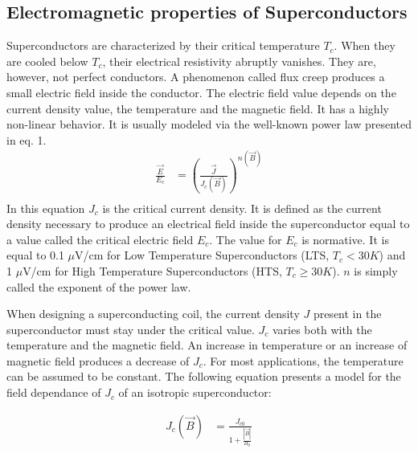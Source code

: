 \documentclass{ws-jmrr}
\begin{document}
\begin{multicols}{2}
\section{Electromagnetic properties of Superconductors}
\label{elec}
Superconductors are characterized by their critical temperature $T_c$. When they are cooled below $T_c$, their electrical resistivity abruptly vanishes. They are, however, not perfect conductors. A phenomenon called flux creep \cite{feigel1989theory} produces a small electric field inside the conductor. The electric field value depends on the current density value, the temperature and the magnetic field. It has a highly non-linear behavior. It is usually modeled via the well-known power law \cite{ONOGI1989991} presented in eq. 1.
\begin{align}
\frac{\vec{E}}{E_c}&=\left (\frac{\vec{J}}{J_c(\vec{B})}  \right )^{n(\vec{B})}
\label{powerlaw}\\
\end{align}
In this equation $J_ c$ is the critical current density. It is defined as the current density necessary to produce an electrical field inside the superconductor equal to a value called the critical electric field $E_c$. The value for $E_c$ is normative. It is equal to 0.1 $\mu$V/cm for Low Temperature Superconductors (LTS, $T_c<30K$) and 1 $\mu$V/cm for High Temperature Superconductors (HTS, $T_c \geq 30K$). $n$ is simply called the exponent of the power law.\par
When designing a superconducting coil, the current density $J$ present in the superconductor must stay under the critical value. $J_c$ varies both with the temperature and the magnetic field. An increase in temperature or an increase of magnetic field produces a decrease of $J_c$. For most applications, the temperature can be assumed to be constant. The following equation presents a model for the field dependance of $J_c$ of an isotropic superconductor: 

\begin{align}
J_c(\vec{B})&=\frac{J_{c0}}{1+\frac{|\vec{B}|}{B_0}}
\label{model1}
\end{align}


\end{multicols}
\end{document}
